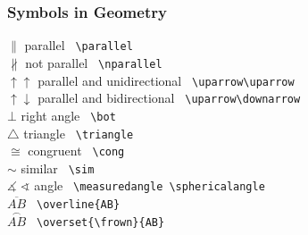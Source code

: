 \subsubsection{Symbols in Geometry}
\begin{tabbing}
\mySymbols
$ {\parallel}$                \> parallel                        \> \verb` \parallel `           \\
$ {\nparallel}$               \> not parallel                    \> \verb` \nparallel `          \\
$ {\uparrow\uparrow}$         \> parallel and unidirectional    \> \verb` \uparrow\uparrow    ` \\
$ {\uparrow\downarrow}$       \> parallel and bidirectional     \> \verb` \uparrow\downarrow `  \\
$ {\bot}$                     \> right angle                     \> \verb` \bot `                \\
$ {\triangle}$                \> triangle                        \> \verb` \triangle  `          \\
$ {\cong}$                    \> congruent                       \> \verb` \cong `               \\
$ {\sim}$                     \> similar                         \> \verb` \sim `                \\
$\measuredangle\;\sphericalangle$  \> angle                      \> \verb` \measuredangle \sphericalangle` \\
$ \overline{AB}$              \>                                 \> \verb` \overline{AB} `       \\
$ {\overset{\frown}{AB}}$     \>                                 \> \verb` \overset{\frown}{AB}` \\
\end{tabbing}

